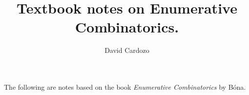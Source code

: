 \documentclass[notitlepage]{report}
\author{David Cardozo}
\title{Textbook notes on Enumerative Combinatorics.}
\begin{document}
\maketitle
The following are notes based on the book \textit{Enumerative Combinatorics} by B\'ona.


\end{document}
